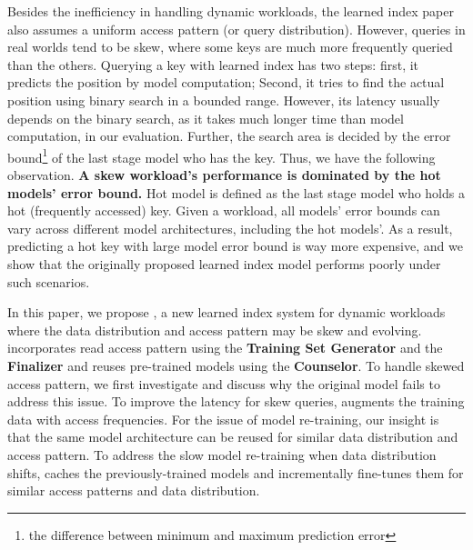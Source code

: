 \begin{bigabstract}
Besides the inefficiency in handling dynamic workloads, the learned index paper also assumes a uniform access pattern (or query distribution).
However, queries in real worlds tend to be skew, where some keys are much more frequently queried than the others.
Querying a key with learned index has two steps: first, it predicts the position by model computation; Second, it tries to find the actual position using binary search in a bounded range.
However, its latency usually depends on the binary search, as it takes much longer time than model computation, in our evaluation.
Further, the search area is decided by the error bound\footnote{the difference between minimum and maximum prediction error} of the last stage model who has the key.
Thus, we have the following observation.
\textbf{A skew workload's performance is dominated by the hot models' error bound.}
Hot model is defined as the last stage model who holds a hot (frequently accessed) key.
Given a workload, all models' error bounds can vary across different model architectures, including the hot models'.
As a result, predicting a hot key with large model error bound is way more expensive, and we show that the originally proposed learned index model performs poorly under such scenarios.

In this paper, we propose \sys, a new learned index system for dynamic workloads where the data distribution and access pattern may be skew and evolving.
\sys incorporates read access pattern using the \textbf{Training Set Generator} and the \textbf{Finalizer} and reuses pre-trained models using the \textbf{Counselor}.
To handle skewed access pattern, we first investigate and discuss why the original model fails to address this issue.
To improve the latency for skew queries, \sys augments the training data with access frequencies.
For the issue of model re-training, our insight is that the same model architecture can be reused for similar data distribution and access pattern.
To address the slow model re-training when data distribution shifts, \sys caches the previously-trained models and incrementally fine-tunes them for similar access patterns and data distribution.


\end{bigabstract}
